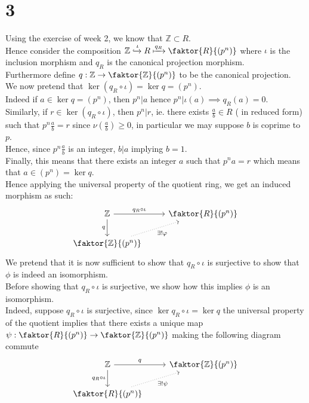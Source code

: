 \documentclass[11pt, a4paper]{article}
\begin{document}
\section*{3}
Using the exercise of week 2, we know that $ \mathbb{Z} \subset R$.\\
Hence consider the composition $ \mathbb{Z} \xhookrightarrow{\iota} R \xmapsto{q_R} \faktor { R} { ( p^{n}) } $ where $\iota$ is the inclusion morphism and $q_R$ is the canonical projection morphism.\\
Furthermore define $ q: \mathbb{Z}\to \faktor { \mathbb{Z}} { ( p^{n}) } $ to be the canonical projection.\\
We now pretend that $\ker ( q_R\circ \iota) = \ker q = ( p^{n}) $.\\

Indeed if $ a \in \ker q = ( p^{n}) $, then $p^{n}| a$ hence $p^{n}| \iota( a) \implies q_R( a) = 0$.\\
Similarly, if $ r\in \ker( q_R\circ \iota) $, then $p^{n}| r$, ie. there exists $ \frac{a}{b}\in R$ ( in reduced form)  such that
$p^{n}\frac{a}{b} = r$ since $\nu( \frac{a}{b}) \geq 0$, in particular we may suppose $b$ is coprime to $p$.\\
Hence, since $p^{n} \frac{a}{b}$ is an integer, $b| a$ implying $b=1$.\\
Finally, this means that there exists an integer $a$ such that $p^{n} a = r$ which means that $a\in ( p^{n}) = \ker q$.\\
Hence applying the universal property of the quotient ring, we get an induced morphism as such:
\[\begin{tikzcd}
	{\mathbb{Z}} & {\faktor{R}{(p^n)}} \\
	{\faktor{\mathbb{Z}}{(p^n)}}
	\arrow["{q_R\circ\iota}", from=1-1, to=1-2]
	\arrow["q"', from=1-1, to=2-1]
	\arrow["{\exists !\varphi}"', dotted, from=2-1, to=1-2]
\end{tikzcd}\]
We pretend that it is now sufficient to show that $q_R \circ\iota$ is surjective to show that $\phi$ is indeed an isomorphism.\\
Before showing that $q_R \circ\iota$ is surjective, we show how this implies $\phi$ is an isomorphism.\\
Indeed, suppose $q_R\circ\iota$ is surjective, since $\ker q_R\circ\iota = \ker q$ the universal property of the quotient implies that there exists a unique map $\psi: \faktor { R} { ( p^{n}) }\to \faktor { \mathbb{Z}} { ( p^{n}) }  $ making the following diagram commute
\[\begin{tikzcd}
	{\mathbb{Z}} & {\faktor{\mathbb{Z}}{(p^n)}} \\
	{\faktor {R}{(p^n)}}
	\arrow["{q_R\circ\iota}"', from=1-1, to=2-1]
	\arrow["q", from=1-1, to=1-2]
	\arrow["{\exists ! \psi}"', dotted, from=2-1, to=1-2]
\end{tikzcd}\]
\end{document}
